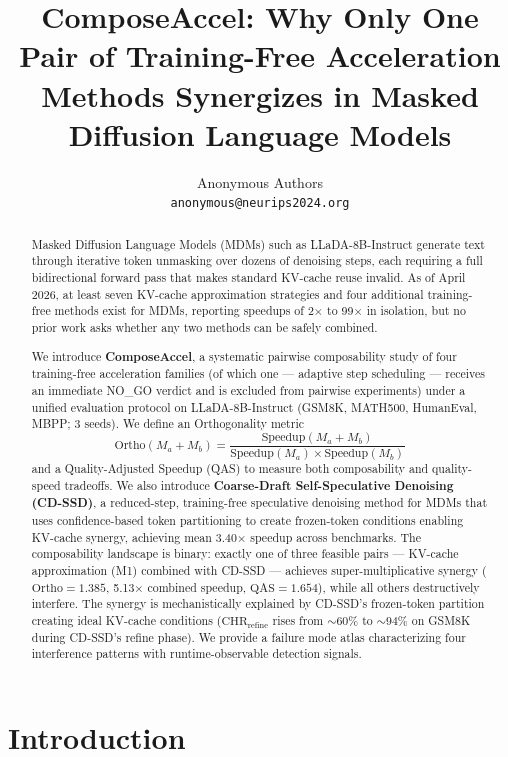 \documentclass{article}
\title{\textbf{ComposeAccel}: Why Only One Pair of Training-Free Acceleration Methods Synergizes in Masked Diffusion Language Models}
\author{%
  Anonymous Authors \\
  \texttt{anonymous@neurips2024.org} \\
}
\newcommand{\ortho}{\text{Ortho}}
\newcommand{\qas}{\text{QAS}}
\newcommand{\speedup}{\text{Speedup}}
\newcommand{\chr}{\text{CHR}}
\begin{document}
\maketitle

\begin{abstract}
Masked Diffusion Language Models (MDMs) such as LLaDA-8B-Instruct generate text through iterative
token unmasking over dozens of denoising steps, each requiring a full bidirectional forward pass that
makes standard KV-cache reuse invalid. As of April 2026, at least seven KV-cache approximation
strategies and four additional training-free methods exist for MDMs, reporting speedups of 2$\times$
to 99$\times$ in isolation, but no prior work asks whether any two methods can be safely combined.

We introduce \textbf{ComposeAccel}, a systematic pairwise composability study of four training-free
acceleration families (of which one --- adaptive step scheduling --- receives an immediate NO\_GO
verdict and is excluded from pairwise experiments) under a unified evaluation protocol on
LLaDA-8B-Instruct (GSM8K, MATH500, HumanEval, MBPP; 3 seeds). We define an Orthogonality metric
\[
  \ortho(M_a + M_b) = \frac{\speedup(M_a + M_b)}{\speedup(M_a) \times \speedup(M_b)}
\]
and a Quality-Adjusted Speedup (QAS) to measure both composability and quality-speed tradeoffs. We
also introduce \textbf{Coarse-Draft Self-Speculative Denoising (CD-SSD)}, a reduced-step,
training-free speculative denoising method for MDMs that uses confidence-based token partitioning
to create frozen-token conditions enabling KV-cache synergy, achieving mean 3.40$\times$ speedup
across benchmarks. The composability landscape is binary: exactly one of three feasible pairs ---
KV-cache approximation (M1) combined with CD-SSD --- achieves super-multiplicative synergy
($\ortho = 1.385$, 5.13$\times$ combined speedup, $\qas = 1.654$), while all others destructively
interfere. The synergy is mechanistically explained by CD-SSD's frozen-token partition creating
ideal KV-cache conditions ($\chr_{\text{refine}}$ rises from ${\sim}60\%$ to ${\sim}94\%$ on GSM8K
during CD-SSD's refine phase). We provide a failure mode atlas characterizing four interference
patterns with runtime-observable detection signals.
\end{abstract}

\section{Introduction}
\label{sec:intro}
\end{document}
